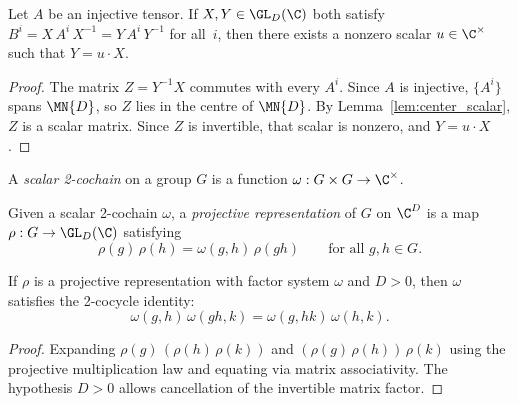 \begin{lemma}\label{lem:gauge_unique_up_to_scalar}
    \leanok
    Let $A$ be an injective tensor.
    If $X, Y \in \GL_D(\C)$ both satisfy
    $B^i = X\, A^i\, X^{-1} = Y\, A^i\, Y^{-1}$
    for all~$i$, then there exists a nonzero scalar $u \in \C^{\times}$
    such that $Y = u \cdot X$.
\end{lemma}

\begin{proof}\leanok{}
    The matrix $Z = Y^{-1} X$ commutes with every $A^i$.
    Since $A$ is injective, $\{A^i\}$ spans $\MN{D}$, so $Z$
    lies in the centre of $\MN{D}$.
    By Lemma~\ref{lem:center_scalar}, $Z$ is a scalar matrix.
    Since $Z$ is invertible, that scalar is nonzero, and
    $Y = u \cdot X$.
\end{proof}

\begin{definition}\label{def:scalar_cocycle}
    \leanok
    A \emph{scalar 2-cochain} on a group $G$ is a function
    $\omega : G \times G \to \C^{\times}$.
\end{definition}

\begin{definition}\label{def:projective_rep}
    \leanok
    Given a scalar 2-cochain $\omega$, a \emph{projective representation}
    of $G$ on $\C^D$ is a map $\rho : G \to \GL_D(\C)$ satisfying
    \[
        \rho(g)\, \rho(h) = \omega(g,h)\, \rho(gh)
        \qquad \text{for all } g, h \in G.
    \]
\end{definition}

\begin{lemma}%
    \label{lem:cocycle_of_assoc}
    \leanok
    If $\rho$ is a projective representation with factor system $\omega$
    and $D > 0$, then $\omega$ satisfies the 2-cocycle identity:
    \[
        \omega(g, h)\, \omega(gh, k)
        = \omega(g, hk)\, \omega(h, k).
    \]
\end{lemma}

\begin{proof}\leanok{}
    Expanding $\rho(g)\,(\rho(h)\,\rho(k))$ and
    $(\rho(g)\,\rho(h))\,\rho(k)$ using the projective
    multiplication law and equating via matrix associativity.
    The hypothesis $D > 0$ allows cancellation of the
    invertible matrix factor.
\end{proof}

